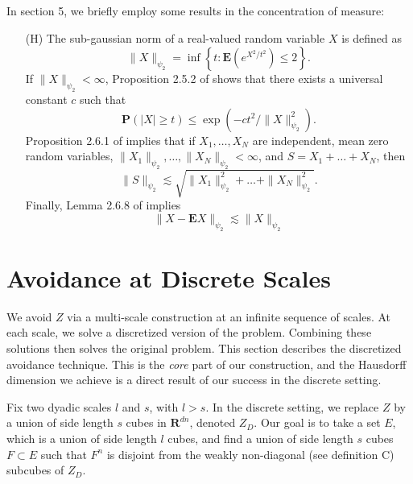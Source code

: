 \documentclass[dvipsnames]{article}
\theoremstyle{plain}
\theoremstyle{plain}
\begin{document}
In section 5, we briefly employ some results in the concentration of measure:

\begin{enumerate}
	\item[(H)] The sub-gaussian norm of a real-valued random variable $X$ is defined as
	\[ \| X \|_{\psi_2} = \inf \left\{ t: \mathbf{E}(e^{X^2/t^2}) \leq 2 \right\}. \]
	If $\| X \|_{\psi_2} < \infty$, Proposition 2.5.2 of \cite{Vershynin} shows that there exists a universal constant $c$ such that
	\begin{equation} \label{subgaussian} \mathbf{P} \left(|X| \geq t \right) \leq \exp(-c t^2 / \| X \|_{\psi_2}^2). \end{equation}
	Proposition 2.6.1 of \cite{Vershynin} implies that if $X_1, \dots, X_N$ are independent, mean zero random variables, $\| X_1 \|_{\psi_2}, \dots, \| X_N \|_{\psi_2} < \infty$, and $S = X_1 + \dots + X_N$, then
	\begin{equation} \label{squareindependence} \| S \|_{\psi_2} \lesssim \sqrt{ \|X_1 \|^2_{\psi_2} + \dots + \| X_N \|^2_{\psi_2}}. \end{equation}
	Finally, Lemma 2.6.8 of \cite{Vershynin} implies
	\begin{equation} \label{centering}
		\| X - \mathbf{E} X \|_{\psi_2} \lesssim \| X \|_{\psi_2}
	\end{equation}
\end{enumerate}






\section{Avoidance at Discrete Scales}

We avoid $Z$ via a multi-scale construction at an infinite sequence of scales. At each scale, we solve a discretized version of the problem. Combining these solutions then solves the original problem. This section describes the discretized avoidance technique. This is the {\it core} part of our construction, and the Hausdorff dimension we achieve is a direct result of our success in the discrete setting.

Fix two dyadic scales $l$ and $s$, with $l > s$. In the discrete setting, we replace $Z$ by a union of side length $s$ cubes in $\mathbf{R}^{dn}$, denoted $Z_D$. Our goal is to take a set $E$, which is a union of side length $l$ cubes, and find a union of side length $s$ cubes $F \subset E$ such that $F^n$ is disjoint from the weakly non-diagonal (see definition C) subcubes of $Z_D$.
\end{document}
